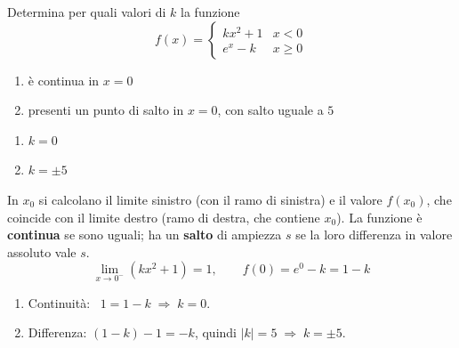 \begin{question}[ID=4.6, subtitle={Continuità e salto di $f$ con $kx^2+1$ e $e^x-k$ in $x=0$}, tags={continuità, parametrico}, difficulty=media]
Determina per quali valori di $k$ la funzione
\[
f(x) = \begin{cases}
    kx^2 + 1 & x < 0 \\
    e^x - k & x \ge 0
\end{cases}
\]
\begin{enumerate}
\item è continua in $x=0$
\item presenti un punto di salto in $x=0$, con salto uguale a $5$
\end{enumerate}
\begin{solution}
\begin{enumerate}
    \item $k=0$
    \item $k=\pm5$
\end{enumerate}
\end{solution}
\begin{explanation}
In $x_0$ si calcolano il limite sinistro (con il ramo di sinistra) e il valore $f(x_0)$, che coincide con il limite destro (ramo di destra, che contiene $x_0$). La funzione è \textbf{continua} se sono uguali; ha un \textbf{salto} di ampiezza $s$ se la loro differenza in valore assoluto vale $s$.
\[ \lim_{x\to0^-}(kx^2+1)=1, \qquad f(0)=e^0-k=1-k \]
\begin{enumerate}
    \item Continuità: \ $1=1-k \;\Rightarrow\; k=0$.
    \item Differenza: $(1-k)-1=-k$, quindi $|k|=5 \;\Rightarrow\; k=\pm5$.
\end{enumerate}
\end{explanation}
\end{question}


